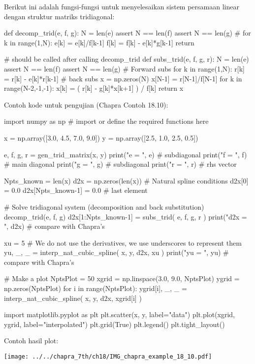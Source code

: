 Berikut ini adalah fungsi-fungsi untuk menyelesaikan sistem persamaan linear dengan
struktur matriks tridiagonal:
\begin{pythoncode}
def decomp_trid(e, f, g):
    N = len(e)
    assert N == len(f)
    assert N == len(g)
    #
    for k in range(1,N):
        e[k] = e[k]/f[k-1]
        f[k] = f[k] - e[k]*g[k-1]
    return
    
# should be called after calling decomp_trid
def subs_trid(e, f, g, r):
    N = len(e)
    assert N == len(f)
    assert N == len(g)
    # Forward subs
    for k in range(1,N):
        r[k] = r[k] - e[k]*r[k-1]
    # back subs
    x = np.zeros(N)
    x[N-1] = r[N-1]/f[N-1]
    for k in range(N-2,-1,-1):
        x[k] = ( r[k] - g[k]*x[k+1] ) / f[k]
    return x    
\end{pythoncode}


Contoh kode untuk pengujian (Chapra Contoh 18.10):
\begin{pythoncode}
import numpy as np
# import or define the required functions here
    
x = np.array([3.0, 4.5, 7.0, 9.0])
y = np.array([2.5, 1.0, 2.5, 0.5])

e, f, g, r = gen_trid_matrix(x, y)
print("e = ", e) # subdiagonal
print("f = ", f) # main diagonal
print("g = ", g) # subdiagonal
print("r = ", r) # rhs vector

Npts_known = len(x)
d2x = np.zeros(len(x))
# Natural spline conditions
d2x[0] = 0.0
d2x[Npts_known-1] = 0.0 # last element

# Solve tridiagonal system (decomposition and back substitution)
decomp_trid(e, f, g)
d2x[1:Npts_known-1] = subs_trid( e, f, g, r )
print("d2x = ", d2x) # compare with Chapra's

xu = 5
# We do not use the derivatives, we use underscores to represent them
yu, _, _ = interp_nat_cubic_spline( x, y, d2x, xu )
print("yu = ", yu) # compare with Chapra's

# Make a plot
NptsPlot = 50
xgrid = np.linspace(3.0, 9.0, NptsPlot)
ygrid = np.zeros(NptsPlot)
for i in range(NptsPlot):
    ygrid[i], _, _ = interp_nat_cubic_spline( x, y, d2x, xgrid[i] )

import matplotlib.pyplot as plt
plt.scatter(x, y, label="data")
plt.plot(xgrid, ygrid, label="interpolated")
plt.grid(True)
plt.legend()
plt.tight_layout()
\end{pythoncode}

Contoh hasil plot:

{\centering
\texttt{[image: ../../chapra\_7th/ch18/IMG\_chapra\_example\_18\_10.pdf]}
\par}
